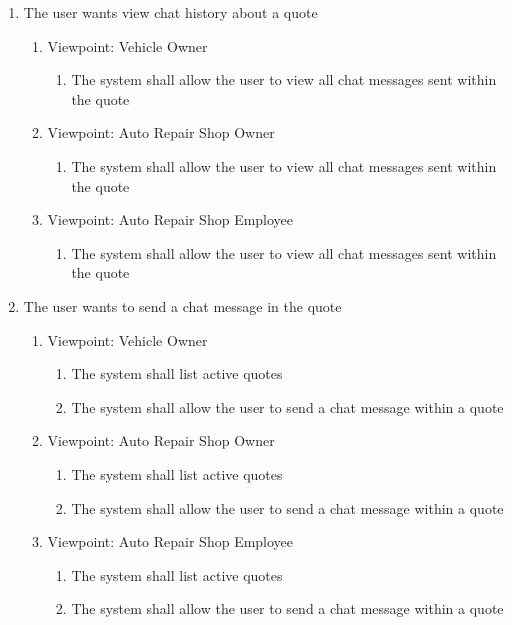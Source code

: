 \documentclass[12pt]{article}
\begin{document}
\begin{enumerate}[resume*=business_events]
	\item The user wants view chat history about a quote
	      \begin{enumerate}[VP\arabic*.]
		      \item Viewpoint: Vehicle Owner
		            \begin{enumerate}
			            \item The system shall allow the user to view all chat messages sent within the quote
		            \end{enumerate}
		      \item Viewpoint: Auto Repair Shop Owner
		            \begin{enumerate}
			            \item The system shall allow the user to view all chat messages sent within the quote
		            \end{enumerate}
		      \item Viewpoint: Auto Repair Shop Employee
		            \begin{enumerate}
			            \item The system shall allow the user to view all chat messages sent within the quote
		            \end{enumerate}
	      \end{enumerate}

	\item The user wants to send a chat message in the quote
	      \begin{enumerate}[VP\arabic*.]
		      \item Viewpoint: Vehicle Owner
		            \begin{enumerate}
			            \item The system shall list active quotes
			            \item The system shall allow the user to send a chat message within a quote
		            \end{enumerate}
		      \item Viewpoint: Auto Repair Shop Owner
		            \begin{enumerate}
			            \item The system shall list active quotes
			            \item The system shall allow the user to send a chat message within a quote
		            \end{enumerate}
		      \item Viewpoint: Auto Repair Shop Employee
		            \begin{enumerate}
			            \item The system shall list active quotes
			            \item The system shall allow the user to send a chat message within a quote
		            \end{enumerate}
	      \end{enumerate}


\end{enumerate}
\end{document}
